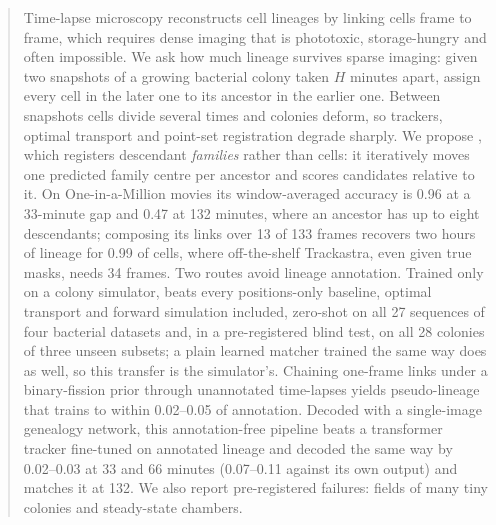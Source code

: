 \begin{abstract}
Time-lapse microscopy reconstructs cell lineages by linking cells frame to frame, which requires dense imaging that is phototoxic, storage-hungry and often impossible.
We ask how much lineage survives sparse imaging: given two snapshots of a growing bacterial colony taken $H$ minutes apart, assign every cell in the later one to its ancestor in the earlier one.
Between snapshots cells divide several times and colonies deform, so trackers, optimal transport and point-set registration degrade sharply.
We propose \ours, which registers descendant \emph{families} rather than cells: it iteratively moves one predicted family centre per ancestor and scores candidates relative to it.
On One-in-a-Million movies its window-averaged accuracy is 0.96 at a 33-minute gap and 0.47 at 132 minutes, where an ancestor has up to eight descendants; composing its links over 13 of 133 frames recovers two hours of lineage for 0.99 of cells, where off-the-shelf Trackastra, even given true masks, needs 34 frames.
Two routes avoid lineage annotation.
Trained only on a colony simulator, \ours beats every positions-only baseline, optimal transport and forward simulation included, zero-shot on all 27 sequences of four bacterial datasets and, in a pre-registered blind test, on all 28 colonies of three unseen subsets; a plain learned matcher trained the same way does as well, so this transfer is the simulator's.
Chaining one-frame links under a binary-fission prior through unannotated time-lapses yields pseudo-lineage that trains \ours to within 0.02--0.05 of annotation.
Decoded with a single-image genealogy network, this annotation-free pipeline beats a transformer tracker fine-tuned on annotated lineage and decoded the same way by 0.02--0.03 at 33 and 66 minutes (0.07--0.11 against its own output) and matches it at 132.
We also report pre-registered failures: fields of many tiny colonies and steady-state chambers.
\end{abstract}
